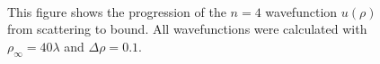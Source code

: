 \documentclass[12pt,twoside]{reedthesis}
\begin{document}
\begin{figure}
\centering {}
 \\ 
\caption[The progression of an eigenstate from scattering to bound]
{This figure shows the progression of the $n = 4$ wavefunction $u(\rho)$ from scattering to bound. All wavefunctions were calculated with $\rho_{\infty} = 40 \lambda$ and $\Delta \rho = 0.1$.} 
\label{fig:scatt-to-bound}
\end{figure}
\end{document}
